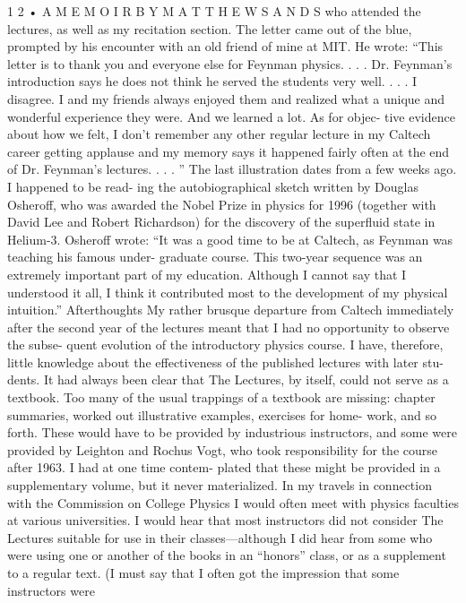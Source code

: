 \documentclass[11pt,oneside]{article}
\begin{document}
1 2 • A  M E M O I R  B Y  M A T T H E W  S A N D S who attended the lectures, as well as my recitation section. The letter came out of the blue, prompted by his encounter with an old friend of mine at MIT. He wrote: “This letter is to thank you and everyone else for Feynman physics. . . . Dr. Feynman’s introduction says he does not think he served the students very well. . . . I disagree. I and my friends always enjoyed them and realized what a unique and wonderful experience they were. And we learned a lot. As for objec- tive evidence about how we felt, I don’t remember any other regular lecture in my Caltech career getting applause and my memory says it happened fairly often at the end of Dr. Feynman’s lectures. . . . ” The last illustration dates from a few weeks ago. I happened to be read- ing the autobiographical sketch written by Douglas Osheroff, who was awarded the Nobel Prize in physics for 1996 (together with David Lee and Robert Richardson) for the discovery of the superfluid state in Helium-3. Osheroff wrote: “It was a good time to be at Caltech, as Feynman was teaching his famous under- graduate course. This two-year sequence was an extremely important part of my education. Although I cannot say that I understood it all, I think it contributed most to the development of my physical intuition.” Afterthoughts My rather brusque departure from Caltech immediately after the second year of the lectures meant that I had no opportunity to observe the subse- quent evolution of the introductory physics course. I have, therefore, little knowledge about the effectiveness of the published lectures with later stu- dents. It had always been clear that The Lectures, by itself, could not serve as a textbook. Too many of the usual trappings of a textbook are missing: chapter summaries, worked out illustrative examples, exercises for home- work, and so forth. These would have to be provided by industrious instructors, and some were provided by Leighton and Rochus Vogt, who took responsibility for the course after 1963. I had at one time contem- plated that these might be provided in a supplementary volume, but it never materialized. In my travels in connection with the Commission on College Physics I would often meet with physics faculties at various universities. I would hear that most instructors did not consider The Lectures suitable for use in their classes---although I did hear from some who were using one or another of the books in an “honors” class, or as a supplement to a regular text. (I must say that I often got the impression that some instructors were\par
\end{document}
